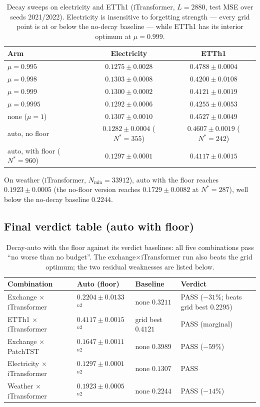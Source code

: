 \begin{table}[t]
\caption{Decay sweeps on electricity and ETTh1 (iTransformer, $L{=}2880$, test MSE over seeds 2021/2022). Electricity is insensitive to forgetting strength --- every grid point is at or below the no-decay baseline --- while ETTh1 has its interior optimum at $\mu{=}0.999$.}
\label{tab:decay_others}
\centering\small
\begin{tabular}{lcc}
\toprule
Arm & Electricity & ETTh1 \\
\midrule
$\mu = 0.995$ & $\mathbf{0.1275 \pm 0.0028}$ & $0.4788 \pm 0.0004$ \\
$\mu = 0.998$ & $0.1303 \pm 0.0008$ & $0.4200 \pm 0.0108$ \\
$\mu = 0.999$ & $0.1300 \pm 0.0002$ & $\mathbf{0.4121 \pm 0.0019}$ \\
$\mu = 0.9995$ & $0.1292 \pm 0.0006$ & $0.4255 \pm 0.0053$ \\
none ($\mu = 1$) & $0.1307 \pm 0.0010$ & $0.4527 \pm 0.0049$ \\
auto, no floor & $0.1282 \pm 0.0004$ ($N^*{=}355$) & $0.4607 \pm 0.0019$ ($N^*{=}242$) \\
auto, with floor ($N^*{=}960$) & $0.1297 \pm 0.0001$ & $\mathbf{0.4117 \pm 0.0015}$ \\
\bottomrule
\end{tabular}
\end{table}

On weather (iTransformer, $N_{\min}{=}33912$), auto with the floor reaches $0.1923 \pm 0.0005$ (the no-floor version reaches $0.1729 \pm 0.0082$ at $N^*{=}287$), well below the no-decay baseline $0.2244$.

\subsection{Final verdict table (auto with floor)}

\begin{table}[t]
\caption{Decay-auto with the floor against its verdict baselines: all five combinations pass ``no worse than no budget''. The exchange$\times$iTransformer run also beats the grid optimum; the two residual weaknesses are listed below.}
\label{tab:decay_verdict}
\centering\small
\begin{tabular}{llll}
\toprule
Combination & Auto (floor) & Baseline & Verdict \\
\midrule
Exchange $\times$ iTransformer & $0.2204 \pm 0.0133$ $^{n2}$ & none $0.3211$ & PASS ($-31\%$; beats grid best $0.2295$) \\
ETTh1 $\times$ iTransformer & $0.4117 \pm 0.0015$ $^{n2}$ & grid best $0.4121$ & PASS (marginal) \\
Exchange $\times$ PatchTST & $0.1647 \pm 0.0011$ $^{n2}$ & none $0.3989$ & PASS ($-59\%$) \\
Electricity $\times$ iTransformer & $0.1297 \pm 0.0001$ $^{n2}$ & none $0.1307$ & PASS \\
Weather $\times$ iTransformer & $0.1923 \pm 0.0005$ $^{n2}$ & none $0.2244$ & PASS ($-14\%$) \\
\bottomrule
\end{tabular}
\end{table}

